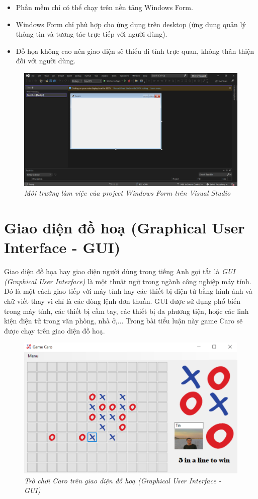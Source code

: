 \begin{itemize}
	\item Phần mềm chỉ có thể chạy trên nền tảng Windows Form.
	\item Windows Form chỉ phù hợp cho ứng dụng trên desktop (ứng dụng quản lý thông tin và tương tác trực tiếp với người dùng).
	\item Đồ họa không cao nên giao diện sẽ thiếu đi tính trực quan, không thân thiện đối với người dùng.
\end{itemize}

\begin{figure}[!h]
	\centering
	\includegraphics[scale=.42]{image/vs.png}
	\caption{\textit{Môi trường làm việc của project Windows Form trên Visual Studio}} 
\end{figure}

\section{Giao diện đồ hoạ (Graphical User Interface - GUI)}
Giao diện đồ họa hay giao diện người dùng trong tiếng Anh gọi tắt là \textit{GUI (Graphical User Interface)} là một thuật ngữ trong ngành công nghiệp máy tính. Đó là một cách giao tiếp với máy tính hay các thiết bị điện tử bằng hình ảnh và chữ viết thay vì chỉ là các dòng lệnh đơn thuần. GUI được sử dụng phổ biến trong máy tính, các thiết bị cầm tay, các thiết bị đa phương tiện, hoặc các linh kiện điện tử trong văn phòng, nhà ở,... Trong bài tiểu luận này game Caro sẽ được chạy trên giao diện đồ hoạ.

\begin{figure}[h!]
	\centering
	\includegraphics[scale=.90]{image/GUI.png}
	\caption{\textit{Trò chơi Caro trên giao diện đồ hoạ (Graphical User Interface - GUI)}} 
\end{figure}

